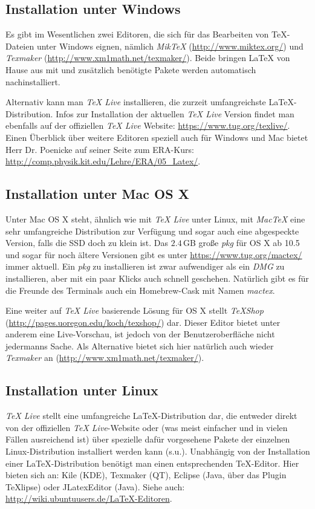 \subsection{Installation unter Windows}
Es gibt im Wesentlichen zwei Editoren, die sich für das Bearbeiten von TeX-Dateien unter Windows eignen, nämlich \textit{MikTeX} (\url{http://www.miktex.org/}) und \textit{Texmaker} (\url{http://www.xm1math.net/texmaker/}). Beide bringen LaTeX von Hause aus mit und zusätzlich benötigte Pakete werden automatisch nachinstalliert.

Alternativ kann man \textit{TeX Live} installieren, die zurzeit umfangreichste LaTeX-Distribution. Infos zur Installation der aktuellen \textit{TeX Live} Version findet man ebenfalls auf der offiziellen \textit{TeX Live} Website: \url{https://www.tug.org/texlive/}. Einen Überblick über weitere Editoren speziell auch für Windows und Mac bietet Herr Dr. Poenicke auf seiner Seite zum ERA-Kurs: \url{http://comp.physik.kit.edu/Lehre/ERA/05_Latex/}.

\subsection{Installation unter Mac OS X}
Unter Mac OS X steht, ähnlich wie mit \textit{TeX Live} unter Linux, mit \textit{MacTeX} eine sehr umfangreiche Distribution zur Verfügung und sogar auch eine abgespeckte Version, falls die SSD doch zu klein ist. Das $2.4$\,GB große \textit{pkg} für OS X ab 10.5 und sogar für noch ältere Versionen gibt es unter \url{https://www.tug.org/mactex/} immer aktuell. Ein \textit{pkg} zu installieren ist zwar aufwendiger als ein \textit{DMG} zu installieren, aber mit ein paar Klicks auch schnell geschehen. Natürlich gibt es für die Freunde des Terminals auch ein Homebrew-Cask mit Namen \textit{mactex}.

Eine weiter auf \textit{TeX Live} basierende Lösung für OS X stellt \textit{TeXShop} (\url{http://pages.uoregon.edu/koch/texshop/}) dar. Dieser Editor bietet unter anderem eine Live-Vorschau, ist jedoch von der Benutzeroberfläche nicht jedermanns Sache. 
Als Alternative bietet sich hier natürlich auch wieder \textit{Texmaker} an (\url{http://www.xm1math.net/texmaker/}).

\subsection{Installation unter Linux}
\textit{TeX Live} stellt eine umfangreiche LaTeX-Distribution dar, die entweder direkt von der offiziellen \textit{TeX Live}-Website oder (was meist einfacher und in vielen Fällen ausreichend ist) über spezielle dafür vorgesehene Pakete der einzelnen Linux-Distribution installiert werden kann (s.u.). Unabhängig von der Installation einer LaTeX-Distribution benötigt man einen entsprechenden TeX-Editor. Hier bieten sich an: Kile (KDE), Texmaker (QT), Eclipse (Java, über das Plugin TeXlipse) oder JLatexEditor (Java). Siehe auch: \url{http://wiki.ubuntuusers.de/LaTeX-Editoren}.

